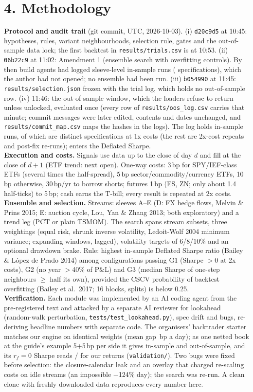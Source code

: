 \documentclass[11pt]{article}
\newcommand{\sect}[1]{\vspace{1pt}\section*{#1}\vspace{-4pt}}
\begin{document}
\sect{4. Methodology}
\textbf{Protocol and audit trail} (git commit, UTC, 2026-10-03). (i) \texttt{d20c9d5} at 10:45: hypotheses, rules, variant neighbourhoods, selection rule, gates and the out-of-sample data lock; the first backtest in \texttt{results/trials.csv} is at 10:53. (ii) \texttt{06b22c9} at 11:02: Amendment 1 (ensemble search with overfitting controls). By then build agents had logged \nPreAmendRuns{} sleeve-level in-sample runs (\nPreAmendSpecs{} specifications), which the author had not opened; no ensemble had been run. (iii) \texttt{b054990} at 11:45: \texttt{results/selection.json} frozen with the trial log, which holds no out-of-sample row. (iv) 11:46: the out-of-sample window, which the loaders refuse to return unless unlocked, evaluated once (every row of \texttt{results/oos\_log.csv} carries that minute; commit messages were later edited, contents and dates unchanged, and \texttt{results/commit\_map.csv} maps the hashes in the logs). The log holds \nISruns{} in-sample runs, of which \ntrials{} are distinct specifications at 1x costs (the rest are 2x-cost repeats and post-fix re-runs); \ntrials{} enters the Deflated Sharpe.\\
\textbf{Execution and costs.} Signals use data up to the close of day $d$ and fill at the close of $d{+}1$ (ETF trend: next open). One-way costs: 3\,bp for SPY/IEF-class ETFs (several times the half-spread), 5\,bp sector/commodity/currency ETFs, 10\,bp otherwise, 30\,bp/yr to borrow shorts; futures 1\,bp (ES, ZN; only about 1.4 half-ticks) to 5\,bp; cash earns the T-bill; every result is repeated at 2x costs.\\
\textbf{Ensemble and selection.} Streams: sleeves A--E (D: FX hedge flows, Melvin \& Prins 2015; E: auction cycle, Lou, Yan \& Zhang 2013; both exploratory) and a trend leg (PCT or plain TSMOM). The search spans stream subsets, three weightings (equal risk, shrunk inverse volatility, Ledoit-Wolf 2004 minimum variance; expanding windows, lagged), volatility targets of 6/8/10\% and an optional drawdown brake. Rule: highest in-sample Deflated Sharpe ratio (Bailey \& L\'opez de Prado 2014) among configurations passing G1 (Sharpe $>0$ at 2x costs), G2 (no year $>$40\% of P\&L) and G3 (median Sharpe of one-step neighbours $\ge$ half its own), provided the CSCV probability of backtest overfitting (Bailey et al.\ 2017; 16 blocks, \nsplits{} splits) is below 0.25.\\
\textbf{Verification.} Each module was implemented by an AI coding agent from the pre-registered text and attacked by a separate AI reviewer for lookahead (random-walk perturbation, \texttt{tests/test\_lookahead.py}), spec drift and bugs, re-deriving headline numbers with separate code. The organisers' backtrader starter matches our engine on identical weights (mean gap \btDiff\,bp a day); as one netted book at the guide's example 5+5\,bp per side it gives \btISg{} in-sample and \btOOSg{} out-of-sample, and its $r_f{=}0$ Sharpe reads \stISdef/\stOOSdef{} for our returns (\texttt{validation/}). Two bugs were fixed before selection: the closure-calendar leak and an overlay that charged re-scaling costs on idle streams (an impossible $-$124\% day); the search was re-run. A clean clone with freshly downloaded data reproduces every number here.
\end{document}
